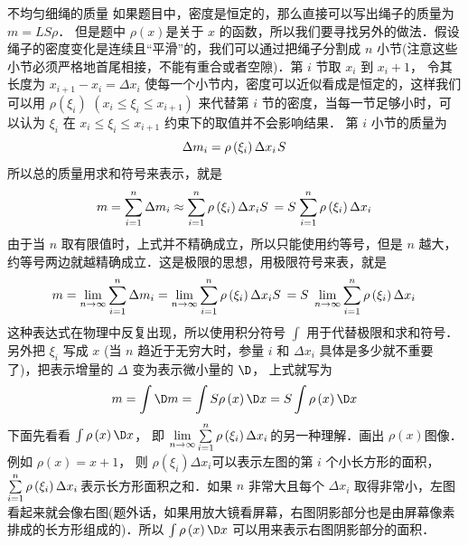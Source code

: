 \begin{exam}{不均匀细绳的质量}
如果题目中，密度是恒定的，那么直接可以写出绳子的质量为 $m = LS\rho$． 但是题中 $\rho(x)$是关于 $x$ 的函数，所以我们要寻找另外的做法．假设绳子的密度变化是连续且“平滑”的，我们可以通过把绳子分割成 $n$ 小节(注意这些小节必须严格地首尾相接，不能有重合或者空隙)．第 $i$ 节取 $x_i$ 到 $x_i +1$， 令其长度为 $x_{i + 1} - {x_i} = \Delta x_i$ 使每一个小节内，密度可以近似看成是恒定的，这样我们可以用 $\rho(\xi _i)\,\, (x_i \le \xi _i \le x_{i + 1})$ 来代替第 $i$ 节的密度，当每一节足够小时，可以认为 ${\xi _i}$ 在 ${x_i} \le {\xi _i} \le {x_{i + 1}}$ 约束下的取值并不会影响结果．
第 $i$ 小节的质量为
\begin{equation}
\Delta {m_i} = \rho \left( {{\xi _i}} \right)\Delta {x_i}{\kern 1pt} S{\kern 1pt} 
\end{equation}
所以总的质量用求和符号来表示，就是
\begin{equation}
m = \sum\limits_{i = 1}^n {\Delta {m_i}}  \approx \sum\limits_{i = 1}^n {\rho \left( {{\xi _i}} \right)\Delta {x_i}S{\kern 1pt} {\kern 1pt} }  = S{\kern 1pt} \sum\limits_{i = 1}^n {\rho \left( {{\xi _i}} \right)\Delta {x_i}{\kern 1pt} } 
\end{equation}
由于当 $n$ 取有限值时，上式并不精确成立，所以只能使用约等号，但是 $n$ 越大，约等号两边就越精确成立．这是极限的思想，用极限符号来表，就是
\begin{equation}
m = \mathop {\lim }\limits_{n \to \infty } \sum\limits_{i = 1}^n {\Delta {m_i}}  = \mathop {\lim }\limits_{n \to \infty } \sum\limits_{i = 1}^n {\rho \left( {{\xi _i}} \right)\Delta {x_i}S{\kern 1pt} {\kern 1pt} }  = S{\kern 1pt} {\kern 1pt} {\kern 1pt} \mathop {\lim }\limits_{n \to \infty } \sum\limits_{i = 1}^n {\rho \left( {{\xi _i}} \right)\Delta {x_i}{\kern 1pt} } 
\end{equation}
这种表达式在物理中反复出现，所以使用积分符号 $\int {} $ 用于代替极限和求和符号．另外把 ${\xi _i}$ 写成 $x$ (当 $n$ 趋近于无穷大时，参量 $i$ 和 $\Delta {x_i}$ 具体是多少就不重要了)，把表示增量的 $\Delta $ 变为表示微小量的 $\D$， 上式就写为
\begin{equation}
m = \int {\D m}  = \int {S\rho \left( x \right)\D x}  = S\int {\rho \left( x \right)\D x} 
\end{equation}
下面先看看 $\int {\rho \left( x \right)\D x} $， 即 $\mathop {\lim }\limits_{n \to \infty } \sum\limits_{i = 1}^n {\rho \left( {{\xi _i}} \right)\Delta {x_i}{\kern 1pt} } $的另一种理解．画出 $\rho (x)$图像．例如 $\rho \left( x \right) = x + 1$， 则 $\rho \left( {{\xi _i}} \right)\Delta {x_i}$可以表示左图的第 $i$ 个小长方形的面积， $\sum\limits_{i = 1}^n {\rho \left( {{\xi _i}} \right)\Delta {x_i}{\kern 1pt} } $表示长方形面积之和．如果 $n$ 非常大且每个 $\Delta {x_i}$ 取得非常小，左图看起来就会像右图(题外话，如果用放大镜看屏幕，右图阴影部分也是由屏幕像素排成的长方形组成的)．所以 $\int {\rho \left( x \right)\D x} $ 可以用来表示右图阴影部分的面积．


\end{exam}
